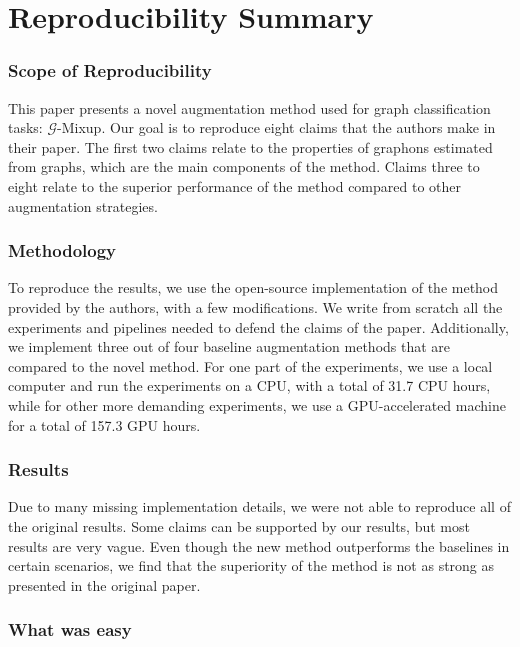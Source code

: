 \section*{\centering Reproducibility Summary}

\subsubsection*{Scope of Reproducibility}

This paper presents a novel augmentation method used for graph classification tasks: $\mathcal{G}$-Mixup. Our goal is to reproduce eight claims that the authors make in their paper. The first two claims relate to the properties of graphons estimated from graphs, which are the main components of the method. Claims three to eight relate to the superior performance of the method compared to other augmentation strategies.

\subsubsection*{Methodology}

To reproduce the results, we use the open-source implementation of the method provided by the authors, with a few modifications. We write from scratch all the experiments and pipelines needed to defend the claims of the paper. Additionally, we implement three out of four baseline augmentation methods that are compared to the novel method. For one part of the experiments, we use a local computer and run the experiments on a CPU, with a total of 31.7 CPU hours, while for other more demanding experiments, we use a GPU-accelerated machine for a total of 157.3 GPU hours.

\subsubsection*{Results}

Due to many missing implementation details, we were not able to reproduce all of the original results. Some claims can be supported by our results, but most results are very vague. Even though the new method outperforms the baselines in certain scenarios, we find that the superiority of the method is not as strong as presented in the original paper.

\subsubsection*{What was easy}

